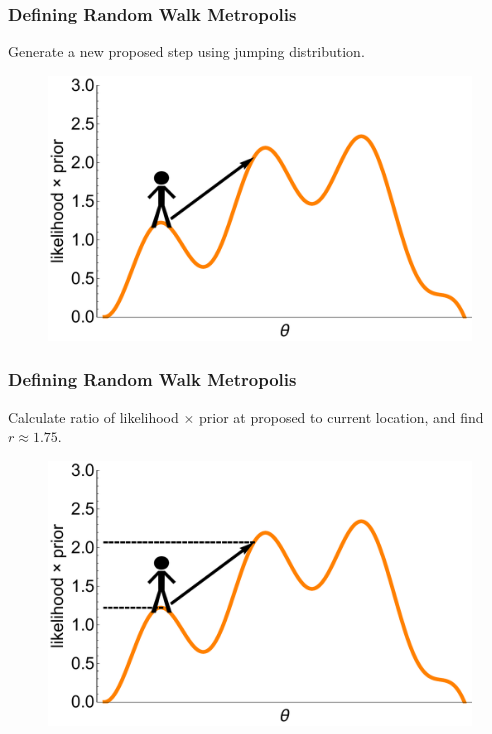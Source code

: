 \documentclass[handout]{beamer}
\begin{document}
\begin{frame}
\frametitle{Defining Random Walk Metropolis}
Generate a new proposed step using jumping distribution.

\begin{figure}[ht]
\centerline{\includegraphics[width=1\textwidth]{./Figures/lec4_metropolisDefinition6.pdf}}
\end{figure}

\end{frame}

\begin{frame}
\frametitle{Defining Random Walk Metropolis}
Calculate ratio of likelihood $\times$ prior at proposed to current location, and find $r \approx 1.75$.

\begin{figure}[ht]
\centerline{\includegraphics[width=1\textwidth]{./Figures/lec4_metropolisDefinition7.pdf}}
\end{figure}

\end{frame}
\end{document}
